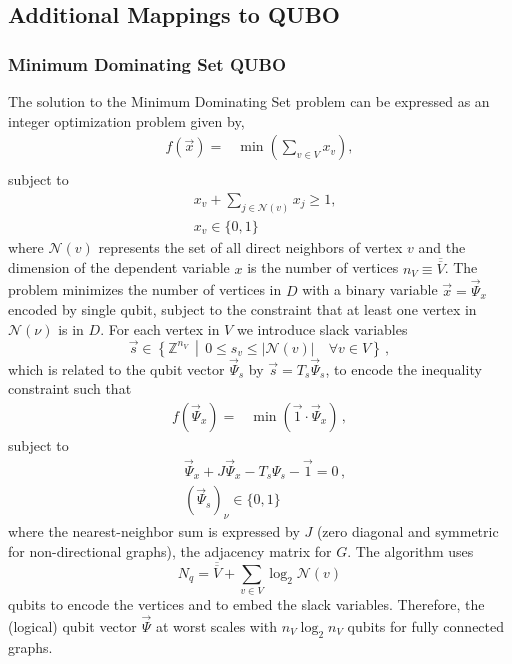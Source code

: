 \documentclass[prd,twocolumn,tightenlines,preprintnumbers,showpacs,superscriptaddress,notitlepage,nofootinbib,eqsecnum,floatfix,longbibliography,aps,10pt]{revtex4-2}
\begin{document}
\subsection{Additional Mappings to QUBO}
\label{sec:methods:ILP-to-QUBO}
\subsubsection{Minimum Dominating Set QUBO}
\label{sec:methods:mds-qubo}

The solution to the Minimum Dominating Set problem can be expressed as an integer optimization problem given by,
\begin{align}
 f(\vec x) = & \min\left(\sum_{v \in V} x_v\right),                    \\
\end{align}
subject to
\begin{align}
 & x_v + \sum_{j \in \mathcal{N}(v)} x_j \geq 1, \\
 & x_v \in \{0, 1\}
\end{align}
where $\mathcal{N}(v)$ represents the set of all direct neighbors of vertex $v$ and the dimension of the dependent variable $x$ is the number of vertices $n_V \equiv \overline{\overline{V}}$.
The problem minimizes the number of vertices in $D$ with a binary variable $\vec x = \vec \Psi_x$ encoded by single qubit, subject to the constraint that at least one vertex in $\mathcal{N}(\nu)$ is in $D$.
For each vertex in $V$ we introduce slack variables
\begin{equation}
    \vec s \in \left\{ \mathbb{Z}^{n_V} \, \middle| \, 0 \leq s_{v} \leq |\mathcal{N}(v)| \quad \forall v\in V \right\} \, ,
\end{equation}
which is related to the qubit vector $\vec \Psi_s$ by $\vec s = T_s \vec \Psi_s$, to encode the inequality constraint such that
\begin{align}
 f(\vec \Psi_x)
 =
 & \min\left(\vec 1 \cdot \vec \Psi_x \right) \, ,
\end{align}
subject to
\begin{align}
 &
 \vec \Psi_x + J \vec \Psi_x - T_s \Psi_s  - \vec 1 = 0\,,
 \\
 &
 (\vec \Psi_s)_\nu \in \{ 0, 1\}
\end{align}
where the nearest-neighbor sum is expressed by $J$ (zero diagonal and symmetric for non-directional graphs), the adjacency matrix for $G$.
The algorithm uses
\begin{equation}
    N_q = \overline{\overline{V}} + \sum_{v \in V} \log_2 \mathcal{N}(v)
\end{equation}
qubits to encode the vertices and to embed the slack variables.
Therefore, the (logical) qubit vector $\vec \Psi$ at worst scales with $n_V \log_2 n_V$ qubits for fully connected graphs.
\end{document}
